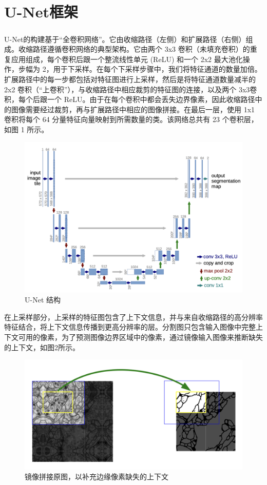 \documentclass[letterpaper, 10pt, conference, twoside]{ieeeconf}
\newcommand{\upcite}[1]{\textsuperscript{\textsuperscript{\cite{#1}}}}
\begin{document}
\section{U-Net框架}
U-Net\upcite{c3}的构建基于“全卷积网络”。它由收缩路径（左侧）和扩展路径（右侧）组成。收缩路径遵循卷积网络的典型架构。它由两个 3x3 卷积（未填充卷积）的重复应用组成，每个卷积后跟一个整流线性单元 (ReLU) 和一个 2x2 最大池化操作，步幅为 2，用于下采样。在每个下采样步骤中，我们将特征通道的数量加倍。扩展路径中的每一步都包括对特征图进行上采样，然后是将特征通道数量减半的 2x2 卷积（“上卷积”），与收缩路径中相应裁剪的特征图的连接，以及两个 3x3卷积，每个后跟一个 ReLU。由于在每个卷积中都会丢失边界像素，因此收缩路径中的图像需要经过裁剪，再与扩展路径中相应的图像拼接。在最后一层，使用 1x1 卷积将每个 64 分量特征向量映射到所需数量的类。该网络总共有 23 个卷积层，如图 1 所示。
\begin{figure}[htbp]
  \centering
  \includegraphics[width = 1\linewidth]{structure.png}
  \caption{U-Net 结构}
  \label{fig:fig1}
\end{figure}

在上采样部分，上采样的特征图包含了上下文信息，并与来自收缩路径的高分辨率特征结合，将上下文信息传播到更高分辨率的层。分割图只包含输入图像中完整上下文可用的像素，为了预测图像边界区域中的像素，通过镜像输入图像来推断缺失的上下文，如图2所示。

\begin{figure}[htbp]
  \centering
  \includegraphics[width = 1\linewidth]{seamless-seg.png}
  \caption{镜像拼接原图，以补充边缘像素缺失的上下文}
  \label{fig:fig2}
\end{figure}
\end{document}
